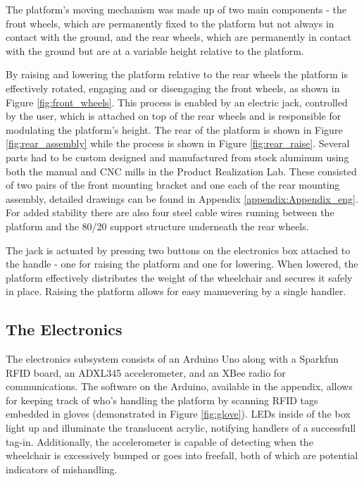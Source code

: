 The platform's moving mechanism was made up of two main components - the front wheels, which are permanently fixed to the platform but not always in contact with the ground, and the rear wheels, which are permanently in contact with the ground but are at a variable height relative to the platform.

By raising and lowering the platform relative to the rear wheels the platform is effectively rotated, engaging and or disengaging the front wheels, as shown in Figure \ref{fig:front_wheels}. This process is enabled by an electric jack, controlled by the user, which is attached on top of the rear wheels and is responsible for modulating the platform's height. The rear of the platform is shown in Figure \ref{fig:rear_assembly} while the process is shown in Figure \ref{fig:rear_raise}. Several parts had to be custom designed and manufactured from stock aluminum using both the manual and CNC mills in the Product Realization Lab. These consisted of two pairs of the front mounting bracket and one each of the rear mounting assembly, detailed drawings can be found in Appendix \ref{appendix:Appendix_eng}. For added stability there are also four steel cable wires running between the platform and the 80/20 support structure underneath the rear wheels.

The jack is actuated by pressing two buttons on the electronics box attached to the handle - one for raising the platform and one for lowering. When lowered, the platform effectively distributes the weight of the wheelchair and secures it safely in place. Raising the platform allows for easy manuevering by a single handler.



\subsection{The Electronics}

The electronics subsystem consists of an Arduino Uno along with a Sparkfun RFID board, an ADXL345 accelerometer, and an XBee radio for communications. The software on the Arduino, available in the appendix, allows for keeping track of who's handling the platform by scanning RFID tags embedded in gloves (demonstrated in Figure \ref{fig:glove}). LEDs inside of the box light up and illuminate the translucent acrylic, notifying handlers of a successfull tag-in. Additionally, the accelerometer is capable of detecting when the wheelchair is excessively bumped or goes into freefall, both of which are potential indicators of mishandling.

